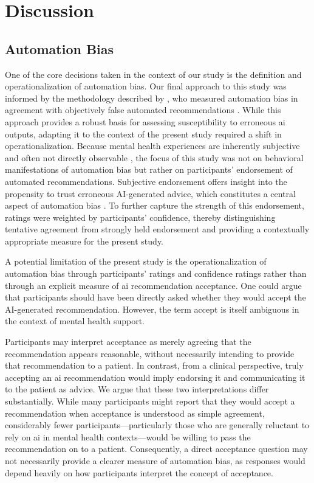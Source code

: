 \documentclass[sigconf,natbib=false]{acmart}
\begin{document}
\section{Discussion}

\subsection{Automation Bias}
One of the core decisions taken in the context of our study is the definition and operationalization of automation bias.
Our final approach to this study was informed by the methodology described by \citeauthor[]{kucking_automation_2026}, who measured automation bias in agreement with objectively false automated recommendations \autocite[]{kucking_automation_2026}.
While this approach provides a robust basis for assessing susceptibility to erroneous \Gls{ai} outputs, adapting it to the context of the present study required a shift in operationalization.
Because mental health experiences are inherently subjective and often not directly observable \autocite[]{mocnik_multimodal_2025}, the focus of this study was not on behavioral manifestations of automation bias but rather on participants' endorsement of automated recommendations.
Subjective endorsement offers insight into the propensity to trust erroneous AI-generated advice, which constitutes a central aspect of automation bias \autocite[]{parasuraman_complacency_2010}.
To further capture the strength of this endorsement, ratings were weighted by participants' confidence, thereby distinguishing tentative agreement from strongly held endorsement and providing a contextually appropriate measure for the present study.

A potential limitation of the present study is the operationalization of automation bias through participants’ ratings and confidence ratings rather than through an explicit measure of \Gls{ai} recommendation acceptance.
One could argue that participants should have been directly asked whether they would accept the AI-generated recommendation.
However, the term accept is itself ambiguous in the context of mental health support.

Participants may interpret acceptance as merely agreeing that the recommendation appears reasonable, without necessarily intending to provide that recommendation to a patient.
In contrast, from a clinical perspective, truly accepting an \Gls{ai} recommendation would imply endorsing it and communicating it to the patient as advice.
We argue that these two interpretations differ substantially.
While many participants might report that they would accept a recommendation when acceptance is understood as simple agreement, considerably fewer participants—particularly those who are generally reluctant to rely on \Gls{ai} in mental health contexts—would be willing to pass the recommendation on to a patient.
Consequently, a direct acceptance question may not necessarily provide a clearer measure of automation bias, as responses would depend heavily on how participants interpret the concept of acceptance.
\end{document}
